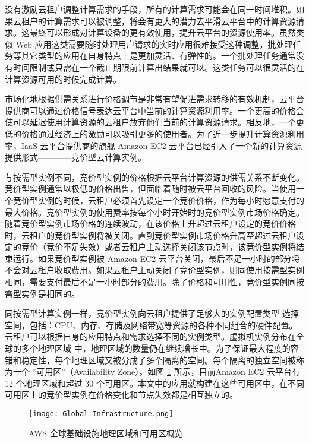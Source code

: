 没有激励云租户调整计算需求的手段，所有的计算需求可能会在同一时间堆积。如果云租户的计算需求可以被调整，将会有更大的潜力去平滑云平台中的计算资源请求。这最终可以形成对计算设备的更有效使用，提升云平台的资源使用率。虽然类似 Web 应用这类需要随时处理用户请求的实时应用很难接受这种调整，批处理任务等其它类型的应用在自身特点上是更加灵活、有弹性的。一个批处理任务通常没有时间限制或只需在一个截止期限前计算出结果就可以。这类任务可以很灵活的在计算资源可用的时候完成计算。

市场化地根据供需关系进行价格调节是非常有望促进需求转移的有效机制，云平台提供商可以通过价格信号表达云平台中当前的计算资源利用率。一个更高的价格会使可以延迟使用计算资源的云租户放弃他们当前的计算资源请求。相反地，一个更低的价格通过经济上的激励可以吸引更多的使用者。为了近一步提升计算资源利用率，IaaS 云平台提供商的旗舰 Amazon EC2 云平台已经引入了一个新的计算资源提供形式————竞价型云计算实例。

与按需型实例不同，竞价型实例的价格根据云平台计算资源的供需关系不断变化。竞价型实例通常以极低的价格出售，但面临着随时被云平台回收的风险。当使用一个竞价型实例的时候，云租户必须首先设定一个竞价价格，作为每小时愿意支付的最大价格。竞价型实例的使用费率按每个小时开始时的竞价型实例市场价格确定。随着竞价型实例市场价格的连续波动，在该价格上升超过云租户设定的竞价价格时，云租户的竞价型实例将被关闭。直到竞价型实例市场价格升高至超过云租户设定的竞价（竞价不足失效）或者云租户主动选择关闭该节点时，该竞价型实例将结束运行。如果竞价型实例被 Amazon EC2 云平台关闭，最后不足一小时的部分将不会对云租户收取费用。如果云租户主动关闭了竞价型实例，则同使用按需型实例相同，需要支付最后不足一小时部分的费用。除了价格和可用性，竞价型实例同按需型实例是相同的。

同按需型计算实例一样，竞价型实例向云租户提供了足够大的实例配置类型 \cite{AWS_IT:2014} 选择空间，包括：CPU、内存、存储及网络带宽等资源的各种不同组合的硬件配置。云租户可以根据自身的应用特点和需求选择不同的实例类型。虚拟机实例分布在全球的多个地理区域 \cite{AWS_GI:2014} 中，地理区域的数量仍在继续增长中。为了保证最大程度的容错和稳定性，每个地理区域又被分成了多个隔离的空间。每个隔离的独立空间被称为一个 ``可用区''（Availability Zone）。如图 \ref{figure:aws-gi} 所示，目前Amazon EC2 云平台有 12 个地理区域和超过 30 个可用区。本文中的应用就构建在这些可用区中，在不同可用区上的竞价型实例在价格变化和节点失效都是相互独立的。
\begin{figure}
  \centering
  \texttt{[image: Global-Infrastructure.png]}
  \caption{AWS 全球基础设施地理区域和可用区概览 \cite{AWS_GI:2014}}
  \label{figure:aws-gi}
\end{figure}

